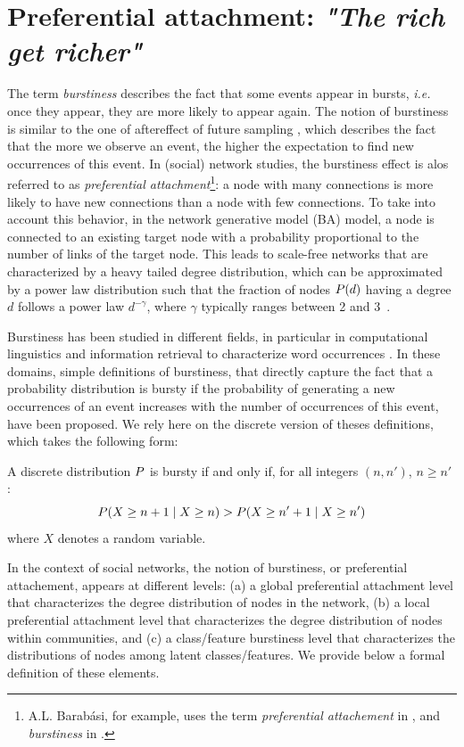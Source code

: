 \section{Preferential attachment: \emph{"The rich get richer"}}
\label{sec:burstiness}

The term \textit{burstiness} describes the fact that some events appear in bursts, \textit{i.e.} once they appear, they are more likely to appear again. The notion of burstiness is similar to the one of aftereffect of future sampling \cite{feller_68}, which describes the fact that the more we observe an event, the higher the expectation to find new occurrences of this event. In (social) network studies, the burstiness effect is alos referred to as \textit{preferential attachment}\footnote{A.L. Barab\'asi, for example, uses the term \textit{preferential attachement} in \cite{barabasi1999emergence}, and \textit{burstiness} in \cite{barabasi_burst}.}: a node with many connections is more likely to have new connections than a node with few connections. To take into account this behavior, in the network generative model  (BA) \cite{albert2002statistical} model, a node is connected to an existing target node with a probability proportional to the number of links of the target node. This leads to scale-free networks that are characterized by a heavy tailed degree distribution, which can be approximated by a power law distribution such that the fraction of nodes $P(d)$ having a degree $d$ follows a power law $d^{-\gamma}$, where $\gamma$ typically ranges between 2 and 3~\cite{barabasi1999emergence}. 

Burstiness has been studied in different fields, in particular in computational linguistics and information retrieval to characterize word occurrences \cite{church1995poisson}. In these domains, simple definitions of burstiness, that directly capture the fact that a probability distribution is bursty if the probability of generating a new occurrences of an event increases with the number of occurrences of this event, have been proposed\cite{clinchant2008bnb,clinchant2010information}. We rely here on the discrete version of theses definitions, which takes the following form:
%
\begin{definition}[Burstiness]
	A discrete distribution $P$ is bursty if and only if, for all integers $(n, n')$, $n \geq n'$ :
	\begin{equation}
	P(X \geq n+1 \mid X \geq n) > P(X \geq n'+1 \mid X \geq n') \nonumber
	\end{equation}
	where $X$ denotes a random variable.
\label{def:burst}
\end{definition}
%
In the context of social networks, the notion of burstiness, or preferential attachement, appears at different levels: (a) a global preferential attachment level that characterizes the degree distribution of nodes in the network, (b) a local preferential attachment level that characterizes the degree distribution of nodes within communities, and (c) a class/feature burstiness level that characterizes the distributions of nodes among latent classes/features. We provide below a formal definition of these elements.
%


